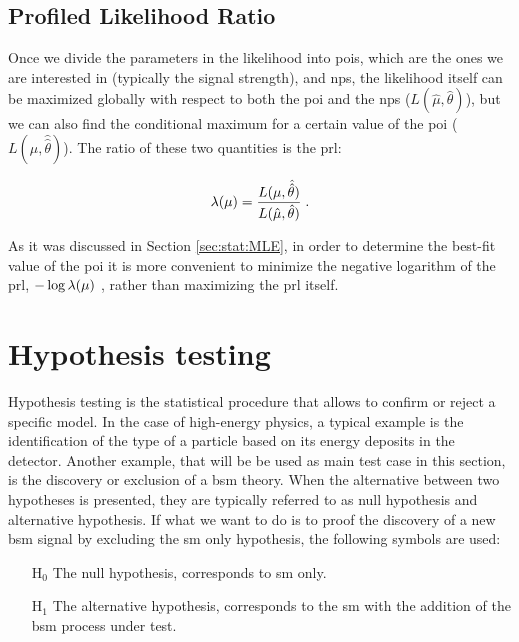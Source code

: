 \subsection{Profiled Likelihood Ratio}

Once we divide the parameters in the likelihood into \glspl{poi}, 
which are the ones we are interested in (typically the signal strength), 
and \glspl{np}, the likelihood itself can be maximized globally with respect to both the \gls{poi} and the \glspl{np} ($L(\hat{\mu}, \hat{\theta})$), but we can also find the conditional maximum for a certain value of the \gls{poi} ($L(\mu, \hat{\hat{\theta}})$). The ratio of these two quantities is the \gls{prl}:

\begin{equation}
\label{eq:stat:prl}
\lambda(\mu) = \frac{ L(\mu, \hat{\hat{\theta}}) } {L(\hat{\mu}, \hat{\theta}) } \;.
\end{equation}

\noindent As it was discussed in Section \ref{sec:stat:MLE},
in order to determine the best-fit value of the \gls{poi} it is more convenient to minimize the negative logarithm of the \gls{prl}, $- \log{\lambda(\mu)} \ $, 
rather than maximizing the \gls{prl} itself.


\section{Hypothesis testing}
\label{sec:stat:ht}

Hypothesis testing is the statistical procedure that allows to confirm or reject a specific model. In the case of high-energy physics, a typical example is the identification of the type of a particle based on its energy deposits in the detector. Another example, that will be be used as main test case in this section, is the discovery or exclusion of a \gls{bsm} theory. When the alternative between two hypotheses is presented, they are typically referred to as null hypothesis and alternative hypothesis. If what we want to do is to proof the discovery of a new \gls{bsm} signal by excluding the \gls{sm} only hypothesis, the following symbols are used:

\begin{itemize}
\item[H$_0$] The null hypothesis, corresponds to \gls{sm} only.
\item[H$_1$] The alternative hypothesis, corresponds to the \gls{sm} with the addition of the \gls{bsm} process under test.
\end{itemize}

